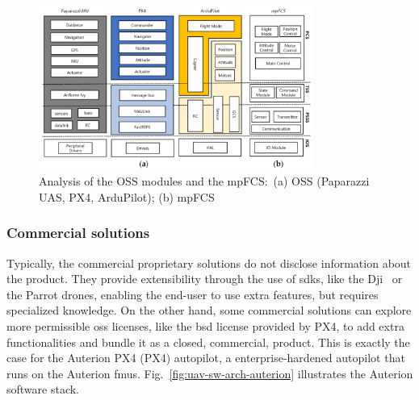 \begin{figure}[!hbt]
  \centering
  \includegraphics[width=0.8\textwidth]{./img/png/uav-sw-arch-oss.png} 
%   
  \caption[Analysis of the OSS modules and the mpFCS]{Analysis of the OSS
    modules and the mpFCS:~(a) OSS (Paparazzi UAS, PX4, ArduPilot); (b) mpFCS~\cite{jargalsaikhan2022architectural}\footnotemark}%
  \label{fig:uav-sw-arch-oss-compar}
\end{figure}
%

\subsubsection{Commercial solutions}%
\label{sec:commercial-solutions-sw}
Typically, the commercial proprietary solutions do not disclose information
about the product. They provide extensibility through the use of
\glspl{sdk}, like the Dji~\cite{djiSDK} or the Parrot drones\cite{parrot-sdk}, enabling the end-user to use
extra features, but requires specialized knowledge.
%
On the other hand, some commercial solutions can explore
more permissible \gls{oss} licenses, like the \gls{bsd} license provided by PX4,
to add extra functionalities and bundle it as a closed, commercial,
product. This is exactly the case for the Auterion PX4 (PX4) autopilot, a
enterprise-hardened autopilot that runs on the Auterion \glspl{fmu}.
Fig.~\ref{fig:uav-sw-arch-auterion} illustrates the Auterion software stack.

